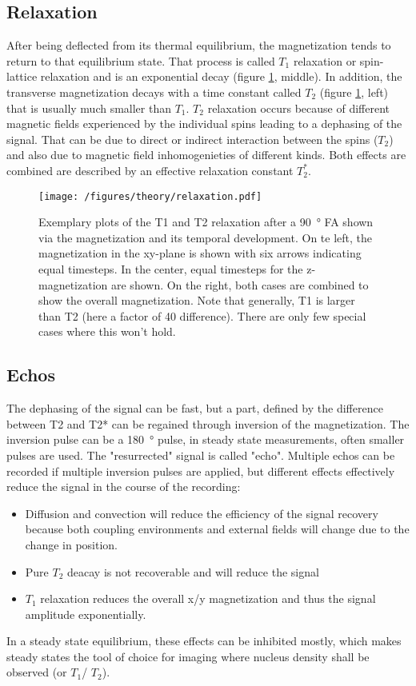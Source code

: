         \subsection{Relaxation}
        \label{chapter:theory:relaxation}
        After being deflected from its thermal equilibrium, the magnetization tends to return to that equilibrium state. That process is called $T_1$ relaxation or spin-lattice relaxation and is an exponential decay (figure \ref{theory:figure:relaxation}, middle). In addition, the transverse magnetization decays with a time constant called $T_2$ (figure \ref{theory:figure:relaxation}, left) that is usually much smaller than $T_1$. $T_2$ relaxation occurs because of different magnetic fields experienced by the individual spins leading to a dephasing of the signal. That can be due to direct or indirect interaction between the spins ($T_2$) and also due to magnetic field inhomogenieties of different kinds. Both effects are combined are described by an effective relaxation constant $T_2^*$.
            \begin{figure}
                \centering
                \texttt{[image: /figures/theory/relaxation.pdf]}
                \caption[Relaxation in NMR]{Exemplary plots of the T1 and T2 relaxation after a \SI{90}{\degree} FA shown via the magnetization and its temporal development. On te left, the magnetization in the xy-plane is shown with six arrows indicating equal timesteps. In the center, equal timesteps for the z-magnetization are shown. On the right, both cases are combined to show the overall magnetization. Note that generally, T1 is larger than T2 (here a factor of 40 difference). There are only few special cases where this won't hold.}
                \label{theory:figure:relaxation}
            \end{figure}
        \subsection{Echos}
        The dephasing of the signal can be fast, but a part, defined by the difference between T2 and T2* can be regained through inversion of the magnetization. The inversion pulse can be a \SI{180}{\degree} pulse, in steady state measurements, often smaller pulses are used. The "resurrected" signal is called "echo". Multiple echos can be recorded if multiple inversion pulses are applied, but different effects effectively reduce the signal in the course of the recording:
        \begin{itemize}
            \item Diffusion and convection will reduce the efficiency of the signal recovery because both coupling environments and external fields will change due to the change in position.
            \item Pure $T_2$ deacay is not recoverable and will reduce the signal
            \item $T_1$ relaxation reduces the overall x/y magnetization and thus the signal amplitude exponentially.
        \end{itemize}
        In a steady state equilibrium, these effects can be inhibited mostly, which makes steady states the tool of choice for imaging where nucleus density shall be observed (or $T_1$/ $T_2$).
